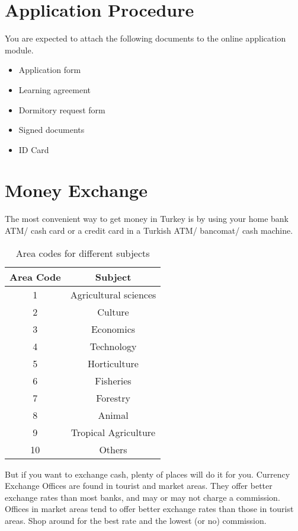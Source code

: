 \section{Application Procedure}
You are expected to attach the following documents to the online application module.

\begin{itemize}
\item Application form
\item Learning agreement
\item Dormitory request form 
\item Signed documents
\item ID Card
\end{itemize}

\section{Money Exchange}
The most convenient way to get money  in Turkey is by using your home bank ATM/ cash card or a credit card in a Turkish ATM/ bancomat/ cash machine.

\begin{table}[!ht]
\caption{Area codes for different subjects}
\centering
\begin{tabular}{|c|c|}
\hline
\textbf{Area Code} & \textbf{Subject}      \\ \hline
1                  & Agricultural sciences \\ \hline
2                  & Culture               \\ \hline
3                  & Economics             \\ \hline
4                  & Technology            \\ \hline
5                  & Horticulture          \\ \hline
6                  & Fisheries             \\ \hline
7                  & Forestry              \\ \hline
8                  & Animal                \\ \hline
9                  & Tropical Agriculture  \\ \hline
10                 & Others                \\ \hline
\end{tabular}
\end{table}

But if you want to exchange cash, plenty of places will do it for you. Currency Exchange Offices  are found in tourist and market areas. They offer better exchange rates than most banks, and may or may not charge a commission. Offices in market areas tend to offer better exchange rates than those in tourist areas. Shop around for the best rate and the lowest (or no) commission.

